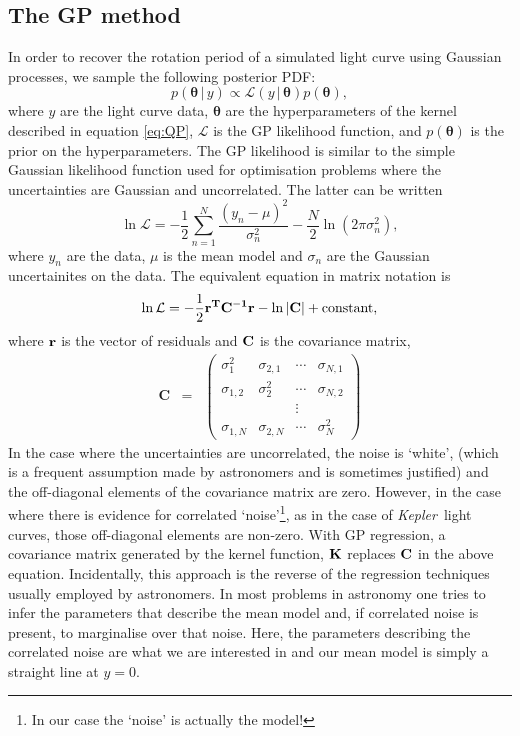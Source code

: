 \documentclass[useAMS, usenatbib, preprint, 12pt]{aastex}
\newcommand{\Kepler}{{\it Kepler}}
\begin{document}
\subsection{The GP method}

In order to recover the rotation period of a simulated light curve using
Gaussian processes, we sample the following posterior PDF:
\begin{equation}
p({\bm \theta}\,|\,y) \propto \mathcal L(y\,|\,{\bm \theta}) p({\bm \theta}),
\end{equation}
\label{eq:posterior}
where $y$ are the light curve data, $\bm \theta$ are the hyperparameters 
of the kernel described in equation \ref{eq:QP}, $\mathcal L$ is the 
GP likelihood function, and $p({\bm \theta})$ is the prior on the 
hyperparameters.  The GP likelihood is similar to the simple Gaussian likelihood
function used for optimisation problems where the uncertainties are
Gaussian and uncorrelated. The latter can be written
\begin{equation}
\ln \mathcal{L} = -\frac{1}{2}\sum_{n=1}^N\frac{(y_n-\mu)^2}{\sigma_n^2}
    - \frac{N}{2}\ln(2\pi\sigma_n^2),
\end{equation}
\label{eq:chi2}
where $y_n$ are the data, $\mu$ is the mean model and $\sigma_n$ are the
Gaussian uncertainites on the data.
The equivalent equation in matrix notation is
\begin{equation}
\ln \mathcal{L} = -\frac{1}{2}\bf{r}^T\bf{C}^{-1}\bf{r}-\ln|\bf{C}|
    + \mathrm{constant},
\end{equation}
\label{eq:lhf1}
where $\bf{r}$ is the vector of residuals and $\bf{C}$ is the covariance
matrix,
\begin{eqnarray}
	\mathbf{C} &=& \left (\begin{array}{cccc}
	\sigma^2_1 & \sigma_{2, 1} & \cdots & \sigma_{N, 1} \\
	\sigma_{1, 2} & \sigma^2_2 & \cdots & \sigma_{N, 2} \\
    && \vdots & \\
	\sigma_{1, N} & \sigma_{2, N} & \cdots & \sigma^2_N
\end{array}\right )
\end{eqnarray}
In the case where the uncertainties are uncorrelated, the noise is `white',
(which is a frequent assumption made by astronomers and is sometimes
justified) and the off-diagonal elements of the covariance matrix are zero.
However, in the case where there is evidence for correlated
`noise'\footnote{In our case the `noise' is actually the model!}, as in the
case of \Kepler\ light curves, those off-diagonal elements are non-zero.
With GP regression, a covariance matrix generated by the kernel function,
${\bf K}$ replaces ${\bf C}$ in the above equation.
Incidentally, this approach is the reverse of the regression techniques
usually employed by astronomers.
In most problems in astronomy one tries to infer the parameters that describe
the mean model and, if correlated noise is present, to marginalise over that
noise.
Here, the parameters describing the correlated noise are what we are
interested in and our mean model is simply a straight line at $y=0$.
\end{document}
